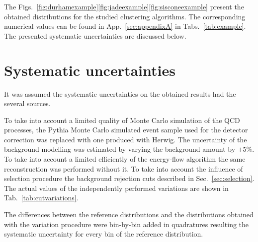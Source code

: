 The Figs.~\ref{fig:durhamexample}\ref{fig:jadeexample}\ref{fig:sisconeexample}
present the obtained distributions for the studied clustering algorithms.
The corresponding numerical values can be found in App.~\ref{sec:appendixA}
in Tabs.~\ref{tab:example}. The  presented systematic uncertainties are discussed below.



























\FloatBarrier
\section{Systematic uncertainties}
\label{sec:systematic}
It was assumed the
 systematic uncertainties on the obtained results 
 had the several sources.

 To take into account a limited quality of Monte Carlo simulation of the
 QCD processes, the Pythia Monte Carlo simulated event sample used for the detector
 correction was replaced with one produced with Herwig.
 The uncertainty of the background modelling was estimated by varying the 
 background amount by $\pm5\%$.
To take into account a limited efficiently of the energy-flow 
algorithm the same reconstruction was performed without it.
 To take into account the influence of selection procedure
the background rejection cuts described in Sec.~\ref{sec:selection}. %
 The actual values of the independently performed variations are shown in Tab.~\ref{tab:cutvariations}.
 \TABcutvariations
 
The differences between the reference distributions and the distributions obtained with 
the variation procedure were bin-by-bin added in quadratures resulting the systematic uncertainty for 
every bin of the reference distribution.
 


